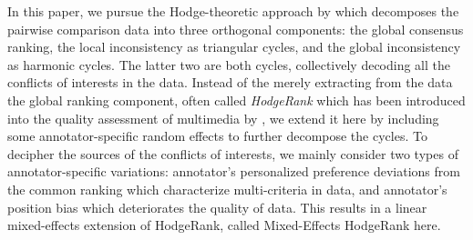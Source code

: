 \documentclass[10pt,journal,cspaper,compsoc]{IEEEtran}
\begin{document}
In this paper, we pursue the Hodge-theoretic approach by \cite{Hodge} which decomposes the pairwise comparison data into three orthogonal components: the global consensus ranking, the local inconsistency as triangular cycles, and the global inconsistency as harmonic cycles. The latter two are both cycles, collectively decoding all the conflicts of interests in the data. Instead of the merely extracting from the data the global ranking component, often called \emph{HodgeRank} which has been introduced into the quality assessment of multimedia by \cite{tmm12}, we extend it here by including some annotator-specific random effects to further decompose the cycles. To decipher the sources of the conflicts of interests, we mainly consider two types of annotator-specific variations: annotator's personalized preference deviations from the common ranking which characterize multi-criteria in data, and annotator's position bias which deteriorates the quality of data. This results in a linear mixed-effects extension of HodgeRank, called Mixed-Effects HodgeRank here.

\end{document}

